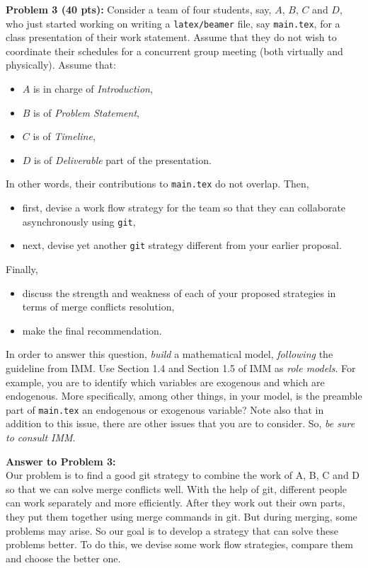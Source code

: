 \documentclass[12pt]{article}
\begin{document}
\newpage
\noindent\textbf{Problem 3 (40 pts):}
Consider a team of four students, say, $A$, $B$, $C$ and $D$, 
who just started working 
on writing a \texttt{latex/beamer} file, say \texttt{main.tex}, 
for a class presentation of their work statement.  
Assume that they do not wish to coordinate their schedules for a
concurrent group meeting (both virtually and physically).  
Assume that:
\begin{itemize}
\item $A$ is in charge of \emph{Introduction},
\item $B$ is of \emph{Problem Statement}, 
\item $C$ is of  \emph{Timeline},
\item $D$ is of \emph{Deliverable} part of the presentation.  
\end{itemize}
In other words, their contributions to \texttt{main.tex} do not overlap.
Then, 
\begin{itemize}
\item first, devise a work flow strategy for the team so that they can
  collaborate asynchronously using \texttt{git},
\item next, devise yet another \texttt{git} strategy different from your earlier
  proposal.  
\end{itemize}
Finally,
\begin{itemize}
\item discuss the strength and weakness of each of your proposed strategies in terms of merge
conflicts resolution,
\item make the final recommendation.  
\end{itemize}
In order to answer this question, \emph{build}
a mathematical model, \emph{following} the guideline from IMM. 
Use Section 1.4 and Section 1.5 of IMM as \emph{role models}.    
For example, you are to identify which variables  are exogenous 
and which are endogenous.  More specifically, among other things, 
in your model, is the preamble part of \texttt{main.tex} an endogenous 
or exogenous variable?  
Note also that in addition to this issue, there are other issues that
you are to consider.  So, \emph{be sure to consult IMM}. 

\newpage
\noindent\textbf{Answer to Problem 3:}\\

Our problem is to find a good git strategy to combine the work of A, B, C and D so that we can solve merge conflicts well. With the help of git, different people can work separately and more efficiently. After they work out their own parts, they put them together using merge commands in git. But during merging, some problems may arise. So our goal is to develop a strategy that can solve these problems better. To do this, we devise some work flow strategies, compare them and choose the better one.\\
\end{document}
